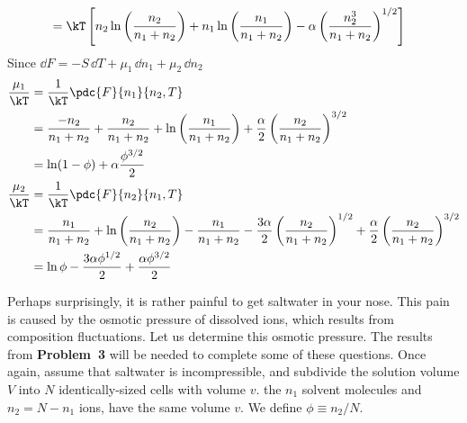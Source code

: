 {\begin{align*}
  &= \kT \left[ n_2 \ln \left( \frac{n_2}{n_1 + n_2} \right) 
              + n_1 \ln \left( \frac{n_1}{n_1 + n_2} \right) 
              - \alpha \left( \frac{n_2^3}{n_1 + n_2} \right)^{1/2} \right]
\end{align*}
Since $\dd F = -S\,\dd T + \mu_1\,\dd n_1 + \mu_2\,\dd n_2$
\begin{align*}
  \frac{\mu_1}{\kT} 
        &= \frac{1}{\kT} \pdc{F}{n_1}{n_2,T} \\
        &= \frac{-n_2}{n_1 + n_2} 
         + \frac{n_2}{n_1 + n_2} 
         + \ln \left( \frac{n_1}{n_1 + n_2} \right) 
         + \frac{\alpha}{2} \left( \frac{n_2}{n_1+n_2} \right)^{3/2}  \\
        &= \ln (1 - \phi) + \alpha \frac{\phi^{3/2}}{2} \\
  \frac{\mu_2}{\kT} 
        &= \frac{1}{\kT} \pdc{F}{n_2}{n_1,T} \\ 
        &= \frac{n_1}{n_1 + n_2} 
         + \ln \left( \frac{n_2}{n_1 + n_2} \right)
         - \frac{n_1}{n_1 + n_2} 
         - \frac{3\alpha}{2} \left( \frac{n_2}{n_1 + n_2} \right)^{1/2}
         + \frac{\alpha}{2} \left( \frac{n_2}{n_1 + n_2} \right)^{3/2} \\
        &= \ln \phi - \frac{3 \alpha \phi^{1/2}}{2} + \frac{\alpha \phi^{3/2}}{2}
\end{align*}
\newpage
}




\bigskip
{}
Perhaps surprisingly, it is rather painful to get saltwater in your nose.
This pain is caused by the osmotic pressure of dissolved ions,
which results from composition fluctuations. 
Let us determine this osmotic pressure.
The results from {\bf Problem~3} will be needed
to complete some of these questions.
Once again, assume that saltwater is incompressible, 
and subdivide the solution volume $V$ into $N$ identically-sized 
cells with volume $v$. 
the $n_1$ solvent molecules and $n_2 = N - n_1$ ions,
have the same volume $v$.  
We define $\phi \equiv n_2/N$. 

